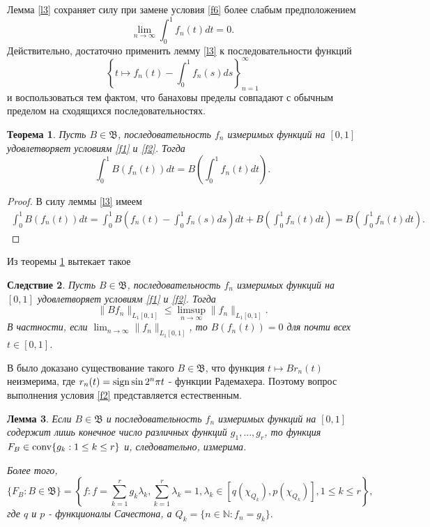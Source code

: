 \documentclass[12pt]{article}
\newtheorem{thm}{Теорема}
\newtheorem{lem}[thm]{Лемма}
\newtheorem{cor}[thm]{Следствие}
\def\N{{\mathbb{N}}}
\def\B{{\mathfrak{B}}}
\begin{document}
Лемма \ref{l3} сохраняет силу при замене условия \eqref{f6} более слабым предположением
$$ \lim_{n\to\infty} \int_0^1 f_n(t) dt=0.$$
Действительно, достаточно применить лемму \ref{l3} к последовательности функций
$$\left\{ t\mapsto f_n(t)-\int_0^1 f_n(s) ds\right\}_{n=1}^\infty$$
и воспользоваться тем фактом, что банаховы пределы совпадают с обычным пределом на сходящихся последовательностях.

 \begin{thm}\label{t1}
Пусть $B\in \B$, последовательность $f_n$  измеримых функций на $[0,1]$  удовлетворяет условиям \eqref{f1} и  \eqref{f2}.
Тогда
\begin{equation*}
\int_0^1 B(f_n(t)) dt = B\left(\int_0^1 f_n(t) dt\right).
 \end{equation*}
\end{thm}

\begin{proof}
В силу леммы \ref{l3} имеем
\begin{align*}
\int_0^1 B(f_n(t)) dt = \int_0^1 B\left(f_n(t)-\int_0^1 f_n(s) ds\right) dt +B\left(\int_0^1 f_n(t) dt\right)= B\left(\int_0^1 f_n(t) dt\right).
\end{align*}
\end{proof}

Из теоремы \ref{t1} вытекает такое

\begin{cor}
Пусть $B\in \B$, последовательность $f_n$  измеримых функций на $[0,1]$  удовлетворяет условиям \eqref{f1} и  \eqref{f2}.
Тогда
$$\|Bf_n \|_{L_1[0,1]}\le \limsup_{n\to\infty} \|f_n \|_{L_1[0,1]}.$$
В частности, если $\lim_{n\to\infty} \|f_n \|_{L_1[0,1]}$, то $B(f_n(t))=0$ для почти всех $t\in[0,1]$.
\end{cor}

В \cite{FT} было доказано существование такого $B\in \B$, что функция $t\mapsto Br_n(t)$ неизмерима, где $r_n(t)={\rm sign} \sin 2^n\pi t$ - функции Радемахера. Поэтому вопрос выполнения условия \eqref{f2} представляется естественным.

\begin{lem}\label{l5}
Если $B\in \B$ и последовательность $f_n$  измеримых функций на $[0,1]$ содержит лишь конечное число различных функций $g_1, ..., g_r$, то функция $F_B\in {\rm conv} \{g_k : 1\le k \le r\}$ и, следовательно, измерима.

Более того,
$$\{F_B: B\in \B\}= \left\{f : f=\sum_{k=1}^r g_k\lambda_k, \sum_{k=1}^r \lambda_k=1, \lambda_k \in [q(\chi_{Q_k}), p(\chi_{Q_k})],  1\le k \le r\right\},$$
где $q$ и $p$  - функционалы Сачестона, а $Q_k =\{n\in\N : f_n=g_k\}.$
\end{lem}
\end{document}

